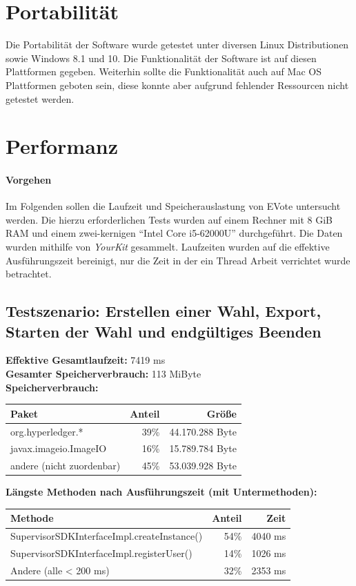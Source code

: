 \documentclass[parskip=full]{scrartcl}
\begin{document}
\section{Portabilität}
Die Portabilität der Software wurde getestet unter diversen Linux Distributionen sowie Windows 8.1 und 10.
Die Funktionalität der Software ist auf diesen Plattformen gegeben.
Weiterhin sollte die Funktionalität auch auf Mac OS Plattformen geboten sein, diese konnte aber aufgrund fehlender Ressourcen nicht getestet werden.
\newpage
\section{Performanz}
\paragraph{Vorgehen}
Im Folgenden sollen die Laufzeit und Speicherauslastung von EVote untersucht werden.
Die hierzu erforderlichen Tests wurden auf einem Rechner mit 8 GiB RAM und einem zwei-kernigen \enquote{Intel Core i5-62000U} durchgeführt. Die Daten wurden mithilfe von \textit{YourKit} gesammelt. Laufzeiten wurden auf die effektive Ausführungszeit bereinigt, nur die Zeit in der ein Thread Arbeit verrichtet wurde betrachtet.
\subsection{Testszenario: Erstellen einer Wahl, Export, Starten der Wahl und endgültiges Beenden}
\textbf{Effektive Gesamtlaufzeit:} 7419 ms\\
\textbf{Gesamter Speicherverbrauch:} 113 MiByte \\
\textbf{Speicherverbrauch:}

\begin{table}[h!]
	\begin{tabular}[t]{l r r}
		Paket & Anteil & Größe \\ \hline
		org.hyperledger.* & 39\% & 44.170.288 Byte \\
		javax.imageio.ImageIO & 16\% & 15.789.784 Byte \\
		andere (nicht zuordenbar) & 45\% & 53.039.928 Byte \\
	\end{tabular}
\end{table}
\textbf{Längste Methoden nach Ausführungszeit (mit Untermethoden):}

\begin{table}[h!]
	\begin{tabular}[t]{lrr}
		Methode & Anteil & Zeit \\ \hline
		SupervisorSDKInterfaceImpl.createInstance() & 54\% & 4040 ms \\
		SupervisorSDKInterfaceImpl.registerUser() & 14\% & 1026 ms \\
		Andere (alle < 200 ms) & 32\% & 2353 ms
	\end{tabular}
\end{table}
\end{document}
